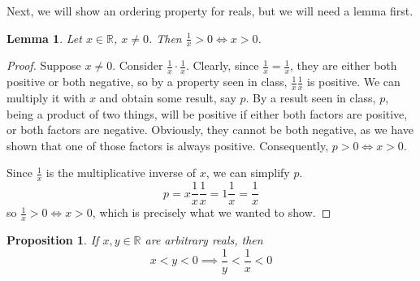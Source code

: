 \documentclass[letterpaper,11pt]{article}
\newcommand{\R}{\mathbb{R}}
\newtheorem{prop}{Proposition}
\newtheorem{lemma}{Lemma}
\begin{document}
Next, we will show an ordering property for reals, but we will need a lemma
first.

\begin{lemma}
    Let $x \in \R$, $x \neq 0$. Then $\frac{1}{x} > 0 \iff x > 0$.
    \label{lem:invsign}
\end{lemma}

\begin{proof}
    Suppose $x \neq 0$. Consider $\frac{1}{x}\cdot\frac{1}{x}$. Clearly, since
    $\frac{1}{x} = \frac{1}{x}$, they are either both positive or both
    negative, so by a property seen in class, $\frac{1}{x}\frac{1}{x}$ is
    positive. We can multiply it with $x$ and obtain some result, say $p$. By a
    result seen in class, $p$, being a product of two things, will
    be positive if either both factors are positive, or both factors are
    negative. Obviously, they cannot be both negative, as we have shown that
    one of those factors is always positive. Consequently, $p > 0 \iff x > 0$.

    Since $\frac{1}{x}$ is the multiplicative inverse of $x$, we can simplify
    $p$.
    \begin{equation*}
        p = x\frac{1}{x}\frac{1}{x} = 1 \frac{1}{x} = \frac{1}{x}
    \end{equation*}
    so $\frac{1}{x} > 0 \iff x > 0$, which is precisely what we wanted to show.
\end{proof}

\begin{prop}
    If $x, y \in \R$ are arbitrary reals, then
    \begin{equation*}
        x < y < 0 \implies \frac{1}{y} < \frac{1}{x} < 0
    \end{equation*}
\end{prop}
\end{document}
